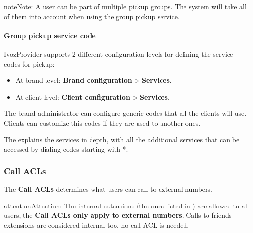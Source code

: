 \documentclass[letterpaper,10pt,english]{sphinxmanual}
\begin{document}
\begin{notice}{note}{Note:}
A user can be part of multiple pickup groups. The system will take
all of them into account when using the group pickup service.
\end{notice}


\paragraph{Group pickup service code}
\label{administration_portal/client/vpbx/user_configuration/pick_up_groups:group-pickup-service-code}
IvozProvider supports 2 different configuration levels for defining the service
codes for pickup:
\begin{itemize}
\item {} 
At brand level: \textbf{Brand configuration} \textgreater{} \textbf{Services}.

\item {} 
At client level: \textbf{Client configuration} \textgreater{} \textbf{Services}.

\end{itemize}

The brand administrator can configure generic codes that all the clients will
use. Clients can customize this codes if they are used to another ones.

The {\hyperref[administration_portal/platform/services:services]{}} explains the services in depth, with
all the additional services that can be accessed by dialing codes starting with
*.


\subsubsection{Call ACLs}
\label{administration_portal/client/vpbx/user_configuration/call_acls:call-permissions}\label{administration_portal/client/vpbx/user_configuration/call_acls::doc}\label{administration_portal/client/vpbx/user_configuration/call_acls:call-acls}
The \textbf{Call ACLs} determines what users can call to external numbers.

\begin{notice}{attention}{Attention:}
The internal extensions (the ones listed in {\hyperref[administration_portal/client/vpbx/extensions:extensions]{}}) are allowed to all users, the \textbf{Call
ACLs only apply to external numbers}. Calls to friends extensions are considered internal too, no call ACL is needed.
\end{notice}
\end{document}
